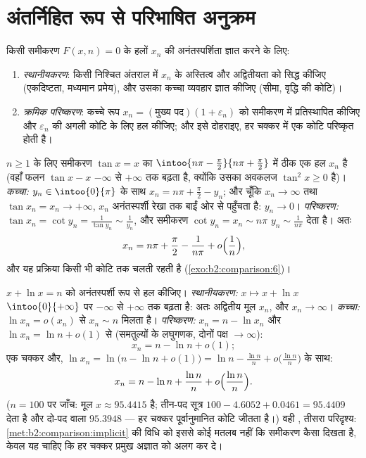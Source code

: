 \section{अंतर्निहित रूप से परिभाषित अनुक्रम}

\begin{method}\label{met:b2:comparison:implicit}
किसी समीकरण $F(x, n) =
0$ के हलों $x_n$ की अनंतस्पर्शिता ज्ञात करने के
लिए:
\begin{enumerate}
  \item \emph{स्थानीयकरण}: किसी निश्चित अंतराल में $x_n$ के अस्तित्व और
        अद्वितीयता को सिद्ध कीजिए (एकदिष्टता, मध्यमान प्रमेय), और उसका
        कच्चा व्यवहार ज्ञात कीजिए (सीमा, वृद्धि की कोटि)।
  \item \emph{क्रमिक परिष्करण}: कच्चे रूप $x_n = (\text{मुख्य
        पद})(1 + \varepsilon_n)$ को समीकरण में प्रतिस्थापित कीजिए और $\varepsilon_n$ की अगली
        कोटि के लिए हल कीजिए; और इसे दोहराइए, हर चक्कर में एक कोटि
        परिष्कृत होती है।
\end{enumerate}
\end{method}

\begin{example}\label{ex:b2:comparison:tan}
$n \geq 1$ के लिए समीकरण $\tan x = x$ का $\intoo{n\pi - \frac\pi2}{n\pi + \frac\pi2}$ में ठीक एक हल $x_n$ है (वहाँ फलन $\tan x - x$ $-\infty$ से
$+\infty$ तक बढ़ता है, क्योंकि उसका अवकलज $\tan^2 x \geq 0$ है)। \emph{कच्चा:} $y_n \in \intoo{0}{\pi}$ के साथ
$x_n = n\pi +
\frac\pi2 - y_n$; और चूँकि $x_n \to
\infty$ तथा $\tan x_n = x_n \to +\infty$, $x_n$ अनंतस्पर्शी रेखा तक बाईं ओर से पहुँचता
है: $y_n \to 0$। \emph{परिष्करण:} $\tan x_n =
\cot y_n = \frac{1}{\tan y_n} \sim \frac{1}{y_n}$, और समीकरण $\cot y_n = x_n \sim n\pi$ $y_n \sim \frac{1}{n\pi}$ देता है। अतः
\[
x_n = n\pi + \frac\pi2 - \frac{1}{n\pi} +
o\Bigl(\frac1n\Bigr),
\]
और यह प्रक्रिया किसी भी कोटि तक चलती रहती है (\cref{exo:b2:comparison:6})।
\end{example}

\begin{example}[विधि का दूसरा चक्कर]\label{ex:b2:comparison:xplusln}
$x + \ln x = n$ को अनंतस्पर्शी रूप से हल कीजिए। \emph{स्थानीयकरण:} $x
\mapsto x + \ln x$ $\intoo{0}{+\infty}$ पर $-\infty$
से $+\infty$ तक बढ़ता है: अतः अद्वितीय मूल $x_n$, और $x_n \to \infty$। \emph{कच्चा:} $\ln x_n = o(x_n)$ से
$x_n \sim n$ मिलता है। \emph{परिष्करण:} $x_n = n - \ln x_n$ और $\ln x_n = \ln n
+ o(1)$ से (समतुल्यों के लघुगणक,
दोनों पक्ष $\to \infty$):
\[
x_n = n - \ln n + o(1) ;
\]
एक चक्कर और, $\ln x_n = \ln\bigl(n - \ln n + o(1)\bigr) =
\ln n - \frac{\ln n}{n} + o\bigl(\frac{\ln n}n\bigr)$ के साथ:
\[
x_n = n - \ln n + \frac{\ln n}{n} +
o\Bigl(\frac{\ln n}{n}\Bigr).
\]
($n = 100$ पर जाँच: मूल $x \approx 95.4415$ है; तीन-पद सूत्र $100 - 4.6052 + 0.0461 = 95.4409$ देता है और दो-पद वाला $95.3948$
--- हर चक्कर पूर्वानुमानित कोटि जीतता है।) वही , तीसरा परिदृश्य:
\cref{met:b2:comparison:implicit} की विधि को इससे कोई मतलब नहीं कि समीकरण कैसा दिखता है, केवल यह
चाहिए कि हर चक्कर प्रमुख अज्ञात को अलग कर दे।
\end{example}


